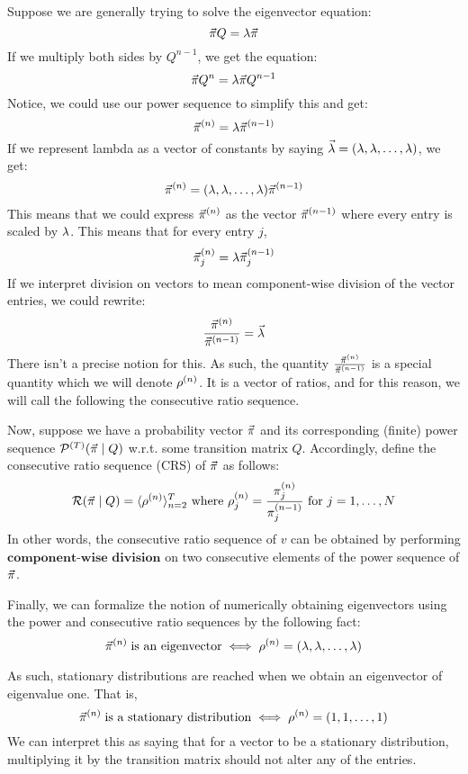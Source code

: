 
\noindent Suppose we are generally trying to solve the eigenvector equation:
$$\pivec Q = \l \pivec$$
If we multiply both sides by $Q^{n-1}$, we get the equation:
$$\pivec Q^n = \l \pivec Q^{n - 1}$$
Notice, we could use our power sequence to simplify this and get:
$$\pivecn{n} = \l \pivecn{n-1}$$
If we represent lambda as a vector of constants by saying $\vec{\l} = (\l, \l, \dots, \l)$, we get:
$$\pivecn{n} = \lambdasvec \pivecn{n - 1}$$
This means that we could express $\pivecn{n}$ as the vector $\pivecn{n - 1}$ where every entry is scaled by $\l$. This means that for every entry $j$,
$$\pivecn{n}_j = \lambda \pivecn{n - 1}_j$$
If we interpret division on vectors to mean component-wise division of the vector entries, we could rewrite:
$$\frac{\pivecn{n}}{\pivecn{n-1}} = \vec{\l}$$
 There isn't a precise notion for this.
As such, the quantity $\frac{\pivecn{n}}{\pivecn{n-1}}$ is a special quantity which we will denote $\rvecn{n}$.
It is a vector of ratios, and for this reason, we will call the following the consecutive ratio sequence.

\begin{definition}
Now, suppose we have a probability vector $\pivec$ and its corresponding (finite) power sequence $\Seq^{(\maxtime)}(\pivec \mid Q)$ w.r.t. some transition matrix $Q$.
Accordingly, define the consecutive ratio sequence (CRS) of $\pivec$ as follows:
$$\Rseq(\pivec \mid Q) = \langle \rvecn{n} \rangle_{n=2}^\maxtime \text{ where } \rvecn{n}_j = \frac{\pin{n}_j}{\pin{n-1}_j} \text{ for } j = \oneto[N]$$
In other words, the consecutive ratio sequence of $v$ can be obtained by performing $\textbf{component-wise division}$ on two consecutive elements of the power sequence of $\pivec$.
\end{definition}



Finally, we can formalize the notion of numerically obtaining eigenvectors using the power and consecutive ratio sequences by the following fact:
$$ \pivecn{n} \; \text{is an eigenvector} \iff \rvecn{n} = \lambdasvec$$

As such, stationary distributions are reached when we obtain an eigenvector of eigenvalue one. That is,
$$ \pivecn{n} \; \text{is a stationary distribution} \iff \rvecn{n} = (1,1,\dots,1)$$
We can interpret this as saying that for a vector to be a stationary distribution, multiplying it by the transition matrix should not alter any of the entries.

